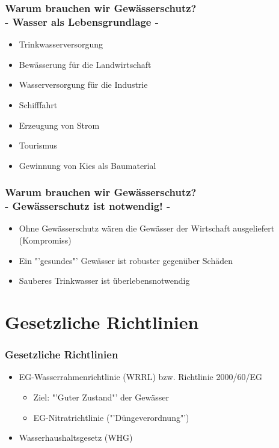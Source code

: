 \documentclass{beamer}
\begin{document}
	\begin{frame}
		\frametitle{Warum brauchen wir Gewässerschutz? \\ - Wasser als Lebensgrundlage - }
		\LARGE
		\begin{itemize}
			\item Trinkwasserversorgung 
			\item Bewässerung für die Landwirtschaft
			\item Wasserversorgung für die Industrie
			\item Schifffahrt
			\item Erzeugung von Strom
			\item Tourismus
			\item Gewinnung von Kies als Baumaterial
		\end{itemize}
	\end{frame}
	
	\begin{frame}
		\frametitle{Warum brauchen wir Gewässerschutz? \\ - Gewässerschutz ist notwendig! - }
		\LARGE
		\begin{itemize}
			\item Ohne Gewässerschutz wären die Gewässer der Wirtschaft ausgeliefert (Kompromiss)
			\item Ein "'gesundes"' Gewässer ist robuster gegenüber Schäden
			\item Sauberes Trinkwasser ist überlebensnotwendig
		\end{itemize}
		
	\end{frame}
	
	\section{Gesetzliche Richtlinien}
	\begin{frame}
		\frametitle{Gesetzliche Richtlinien}
		\LARGE
		
		\begin{itemize}
			\item EG-Wasserrahmenrichtlinie (WRRL) bzw. Richtlinie 2000/60/EG
			
			\begin{itemize}
				\LARGE
				\item Ziel: "'Guter Zustand"' der Gewässer
				
				\item EG-Nitratrichtlinie ("'Düngeverordnung"')
			\end{itemize}
			
			\item Wasserhaushaltsgesetz (WHG)
		\end{itemize}
	\end{frame}
	
\end{document}
